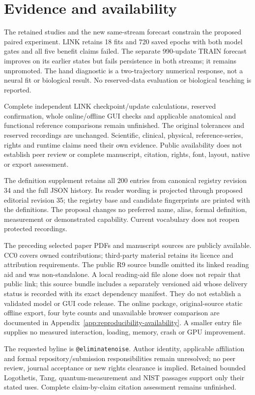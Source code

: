 \section*{Evidence and availability}
The retained studies and the new same-stream forecast constrain the proposed paired experiment. LINK retains 18 fits and 720 saved epochs with both model gates and all five benefit claims failed. The separate 990-update TRAIN forecast improves on its earlier states but fails persistence in both streams; it remains unpromoted. The hand diagnostic is a two-trajectory numerical response, not a neural fit or biological result. No reserved-data evaluation or biological teaching is reported.

Complete independent LINK checkpoint/update calculations, reserved confirmation, whole online/offline GUI checks and applicable anatomical and functional reference comparisons remain unfinished. The original tolerances and reserved recordings are unchanged. Scientific, clinical, physical, reference-series, rights and runtime claims need their own evidence. Public availability does not establish peer review or complete manuscript, citation, rights, font, layout, native or export assessment.

The definition supplement retains all 200 entries from canonical registry revision 34 and the full JSON history. Its reader wording is projected through proposed editorial revision 35; the registry base and candidate fingerprints are printed with the definitions. The proposal changes no preferred name, alias, formal definition, measurement or demonstrated capability. Current vocabulary does not reopen protected recordings.

The preceding selected paper PDFs and manuscript sources are publicly available. CC0 covers owned contributions; third-party material retains its licence and attribution requirements. The public R9 source bundle omitted its linked reading aid and was non-standalone. A local reading-aid file alone does not repair that public link; this source bundle includes a separately versioned aid whose delivery status is recorded with its exact dependency manifest. They do not establish a validated model or GUI code release. The online package, original-source static offline export, four byte counts and unavailable browser comparison are documented in Appendix~\ref{app:reproducibility-availability}. A smaller entry file supplies no measured interaction, loading, memory, crash or GPU improvement.

The requested byline is \texttt{@eliminatenoise}. Author identity, applicable affiliation and formal repository/submission responsibilities remain unresolved; no peer review, journal acceptance or new rights clearance is implied. Retained bounded Logothetis, Tang, quantum-measurement and NIST passages support only their stated uses. Complete claim-by-claim citation assessment remains unfinished.
